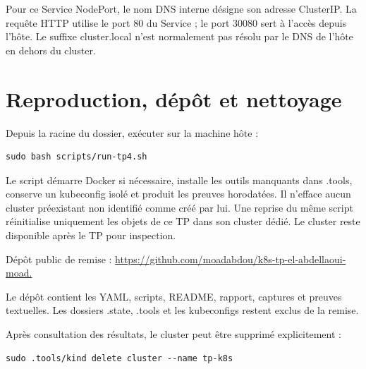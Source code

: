 \documentclass[11pt,a4paper]{article}
\begin{document}
Pour ce Service NodePort, le nom DNS interne désigne son adresse ClusterIP. La requête HTTP
utilise le port 80 du Service ; le port 30080 sert à l'accès depuis l'hôte. Le suffixe cluster.local
n'est normalement pas résolu par le DNS de l'hôte en dehors du cluster.

\clearpage
{}\section{Reproduction, dépôt et nettoyage}

Depuis la racine du dossier, exécuter sur la machine hôte :

\par\vspace{4pt}\noindent\begin{minipage}{\linewidth}
\begin{Verbatim}[breaklines=true,breakanywhere=true,fontsize=\footnotesize,frame=single,framesep=8pt,rulecolor=\color{teal}]
sudo bash scripts/run-tp4.sh
\end{Verbatim}
\end{minipage}\par\vspace{6pt}

Le script démarre Docker si nécessaire, installe les outils manquants dans .tools, conserve
un kubeconfig isolé et produit les preuves horodatées. Il n'efface aucun cluster préexistant
non identifié comme créé par lui. Une reprise du même script réinitialise uniquement les objets
de ce TP dans son cluster dédié. Le cluster reste disponible après le TP pour inspection.

Dépôt public de remise : \url{https://github.com/moadabdou/k8s-tp-el-abdellaoui-moad.}

Le dépôt contient les YAML, scripts, README, rapport, captures et preuves textuelles.
Les dossiers .state, .tools et les kubeconfigs restent exclus de la remise.

Après consultation des résultats, le cluster peut être supprimé explicitement :

\par\vspace{4pt}\noindent\begin{minipage}{\linewidth}
\begin{Verbatim}[breaklines=true,breakanywhere=true,fontsize=\footnotesize,frame=single,framesep=8pt,rulecolor=\color{teal}]
sudo .tools/kind delete cluster --name tp-k8s
\end{Verbatim}
\end{minipage}\par\vspace{6pt}
\end{document}
